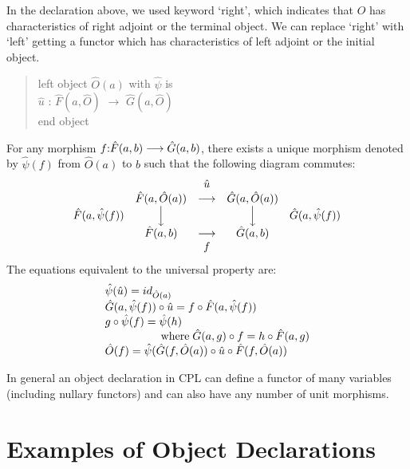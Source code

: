 In the declaration above, we used keyword `right', which indicates that $O$
has characteristics of right adjoint or the terminal object.  We can replace
`right' with `left' getting a functor which has characteristics of left
adjoint or the initial object.
\begin{quote}
left object $\hat{O}(a)$ with $\hat{\psi}$ is \\
\makebox[2em]{} $\hat{u}$ : $\hat{F}(a,\hat{O})$ $\longrightarrow$
	$\hat{G}(a,\hat{O})$ \\
end object \\
\end{quote}
For any morphism $f{\rm :}\hat{F}(a,b)\longrightarrow \hat{G}(a,b)$, there
exists a unique morphism denoted by $\hat{\psi}(f)$ from $\hat{O}(a)$ to $b$
such that the following diagram commutes:
\begin{displaymath}
\begin{array}{rcccl}
& & \hat{u} & & \\
& \hat{F}(a,\hat{O}(a)) & \longrightarrow & \hat{G}(a,\hat{O}(a)) & \\
\hat{F}(a,\hat{\psi}(f)) & {\Big\downarrow} & & {\Big\downarrow} &
	\hat{G}(a,\hat{\psi}(f)) \\
& \hat{F}(a,b) & \longrightarrow & \hat{G}(a,b) & \\
& & f & & \\
\end{array}
\end{displaymath}
The equations equivalent to the universal property are:
\begin{displaymath}
\begin{array}{l}
\hat{\psi}(\hat{u}) = id_{\hat{O}(a)} \\
\hat{G}(a,\hat{\psi}(f))\circ \hat{u} = f\circ \hat{F}(a,\hat{\psi}(f)) \\ 
g\circ \hat{\psi}(f) = \hat{\psi}(h) \\
\makebox[5em]{} {\rm where} \; \hat{G}(a,g)\circ f = h\circ \hat{F}(a,g) \\
\hat{O}(f) = \hat{\psi}(\hat{G}(f,\hat{O}(a))\circ \hat{u}\circ
	\hat{F}(f,\hat{O}(a)) \\
\end{array}
\end{displaymath}

In general an object declaration in CPL can define a functor of many
variables (including nullary functors) and can also have any number of unit
morphisms.


\section{Examples of Object Declarations}

